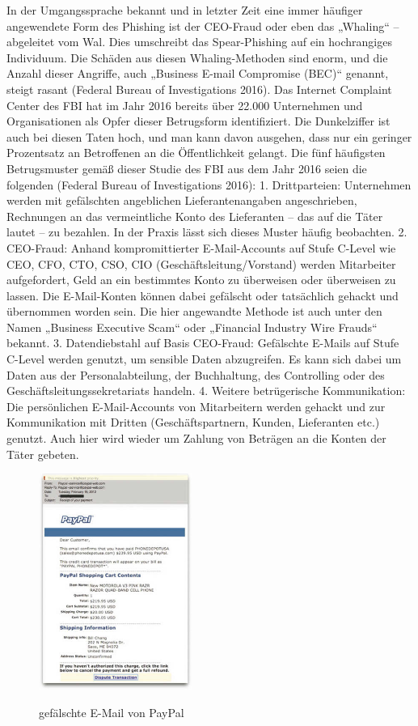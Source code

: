 In der Umgangssprache bekannt und in letzter Zeit eine immer häufiger angewendete
Form des Phishing ist der CEO-Fraud oder eben das „Whaling“ – abgeleitet vom Wal.
Dies umschreibt das Spear-Phishing auf ein hochrangiges Individuum. Die Schäden aus
diesen Whaling-Methoden sind enorm, und die Anzahl dieser Angriffe, auch „Business
E-mail Compromise (BEC)“ genannt, steigt rasant (Federal Bureau of Investigations 2016).
Das Internet Complaint Center des FBI hat im Jahr 2016 bereits über 22.000 Unternehmen
und Organisationen als Opfer dieser Betrugsform identifiziert. Die Dunkelziffer ist
auch bei diesen Taten hoch, und man kann davon ausgehen, dass nur ein geringer Prozentsatz
an Betroffenen an die Öffentlichkeit gelangt.
Die fünf häufigsten Betrugsmuster gemäß dieser Studie des FBI aus dem Jahr 2016
seien die folgenden (Federal Bureau of Investigations 2016):
1. Drittparteien: Unternehmen werden mit gefälschten angeblichen Lieferantenangaben
angeschrieben, Rechnungen an das vermeintliche Konto des Lieferanten – das auf die
Täter lautet – zu bezahlen. In der Praxis lässt sich dieses Muster häufig beobachten.
2. CEO-Fraud: Anhand kompromittierter E-Mail-Accounts auf Stufe C-Level wie CEO,
CFO, CTO, CSO, CIO (Geschäftsleitung/Vorstand) werden Mitarbeiter aufgefordert,
Geld an ein bestimmtes Konto zu überweisen oder überweisen zu lassen. Die
E-Mail-Konten können dabei gefälscht oder tatsächlich gehackt und übernommen worden
sein. Die hier angewandte Methode ist auch unter den Namen „Business Executive
Scam“ oder „Financial Industry Wire Frauds“ bekannt.
3. Datendiebstahl auf Basis CEO-Fraud: Gefälschte E-Mails auf Stufe C-Level werden
genutzt, um sensible Daten abzugreifen. Es kann sich dabei um Daten aus der Personalabteilung,
der Buchhaltung, des Controlling oder des Geschäftsleitungssekretariats
handeln.
4. Weitere betrügerische Kommunikation: Die persönlichen E-Mail-Accounts von Mitarbeitern
werden gehackt und zur Kommunikation mit Dritten (Geschäftspartnern,
Kunden, Lieferanten etc.) genutzt. Auch hier wird wieder um Zahlung von Beträgen an
die Konten der Täter gebeten.

\begin{figure}[h]
    \centering
\includegraphics[width = 5cm]{figures/ChristopherHadn_2014_Kapitel2WasIstSocialE_SocialEngineeringEntt.jpg}
\caption{gefälschte E-Mail von PayPal}
\cite{GrundformenDesSE}
\label{fig:PhishingPayPal}
\end{figure}




